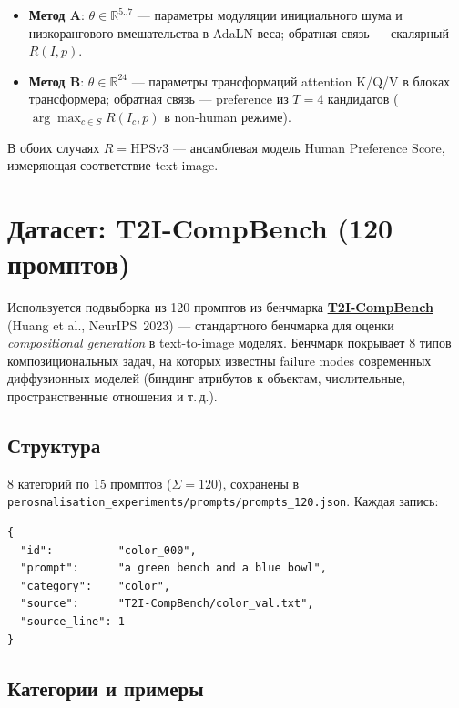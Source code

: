 \documentclass[11pt,a4paper]{article}
\begin{document}
\begin{itemize}[leftmargin=2em]
  \item \textbf{Метод A}: $\theta \in \mathbb{R}^{5..7}$ --- параметры
        модуляции инициального шума и низкорангового вмешательства в
        AdaLN-веса; обратная связь --- скалярный $R(I,p)$.
  \item \textbf{Метод B}: $\theta \in \mathbb{R}^{24}$ --- параметры
        трансформаций attention K/Q/V в блоках трансформера; обратная
        связь --- preference из $T=4$ кандидатов
        (\(\arg\max_{c \in S} R(I_c,p)\) в non-human режиме).
\end{itemize}

В обоих случаях $R = \text{HPSv3}$ --- ансамблевая модель Human Preference
Score, измеряющая соответствие text-image.

\section{Датасет: T2I-CompBench (120 промптов)}

Используется подвыборка из 120 промптов из бенчмарка
\href{https://github.com/Karine-Huang/T2I-CompBench}{\textbf{T2I-CompBench}}
(Huang et al., NeurIPS~2023) --- стандартного бенчмарка для оценки
\emph{compositional generation} в text-to-image моделях. Бенчмарк
покрывает 8 типов композициональных задач, на которых известны failure
modes современных диффузионных моделей (биндинг атрибутов к объектам,
числительные, пространственные отношения и т.\,д.).

\subsection{Структура}

8 категорий по 15 промптов ($\Sigma=120$), сохранены в
\texttt{perosnalisation\_experiments/prompts/prompts\_120.json}. Каждая
запись:
\begin{lstlisting}
{
  "id":          "color_000",
  "prompt":      "a green bench and a blue bowl",
  "category":    "color",
  "source":      "T2I-CompBench/color_val.txt",
  "source_line": 1
}
\end{lstlisting}

\subsection{Категории и примеры}
\end{document}
